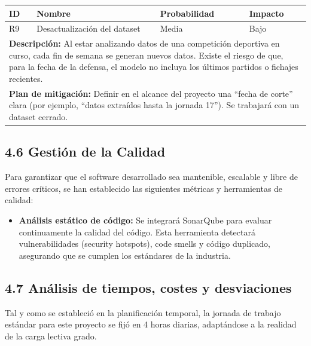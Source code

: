 \vspace{0.3cm}

\begin{center}
\small
\begin{tabular}{|p{}|p{}|p{}|p{}|}
\hline
\textbf{ID} & \textbf{Nombre} & \textbf{Probabilidad} & \textbf{Impacto} \\
\hline
R9 & Desactualización del dataset & Media & Bajo \\
\hline
\multicolumn{4}{|p{0.9\textwidth}|}{\textbf{Descripción:} Al estar analizando datos de una competición deportiva en curso, cada fin de semana se generan nuevos datos. Existe el riesgo de que, para la fecha de la defensa, el modelo no incluya los últimos partidos o fichajes recientes.} \\
\hline
\multicolumn{4}{|p{0.9\textwidth}|}{\textbf{Plan de mitigación:} Definir en el alcance del proyecto una ``fecha de corte'' clara (por ejemplo, ``datos extraídos hasta la jornada 17''). Se trabajará con un dataset cerrado.} \\
\hline
\end{tabular}
\end{center}

\subsection{4.6 Gestión de la Calidad}

Para garantizar que el software desarrollado sea mantenible, escalable y libre de errores críticos, se han establecido las siguientes métricas y herramientas de calidad:

\begin{itemize}
    \item \textbf{Análisis estático de código:} Se integrará SonarQube para evaluar continuamente la calidad del código. Esta herramienta detectará vulnerabilidades (security hotspots), code smells y código duplicado, asegurando que se cumplen los estándares de la industria.
\end{itemize}

\subsection{4.7 Análisis de tiempos, costes y desviaciones}

Tal y como se estableció en la planificación temporal, la jornada de trabajo estándar para 
este proyecto se fijó en 4 horas diarias, adaptándose a la realidad de la carga lectiva 
 grado. 
 
